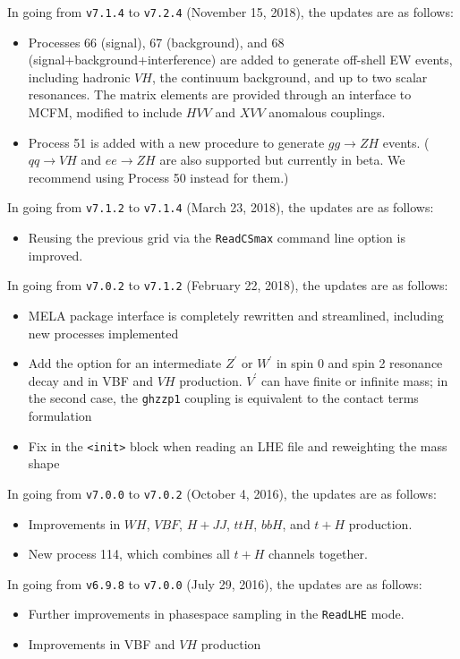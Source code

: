 \documentclass[aps,superscriptaddress,nofootinbib]{revtex4}
\begin{document}
In going from \verb|v7.1.4| to \verb|v7.2.4| (November 15, 2018), the updates are as follows:
\begin{itemize}
\item Processes 66 (signal), 67 (background), and 68 (signal+background+interference) are added to generate off-shell EW events, including hadronic $VH$, the continuum background, and up to two scalar resonances.  The matrix elements are provided through an interface to MCFM, modified to include $HVV$ and $XVV$ anomalous couplings.
\item Process 51 is added with a new procedure to generate $gg \to ZH$ events.  ($qq\to VH$ and $ee\to ZH$ are also supported but currently in beta.  We recommend using Process 50 instead for them.)
\end{itemize}
\noindent
In going from \verb|v7.1.2| to \verb|v7.1.4| (March 23, 2018), the updates are as follows:
\begin{itemize}
\item Reusing the previous grid via the \verb|ReadCSmax| command line option is improved.
\end{itemize}
\noindent
In going from \verb|v7.0.2| to \verb|v7.1.2| (February 22, 2018), the updates are as follows:
\begin{itemize}
\item MELA package interface is completely rewritten and streamlined, including new processes implemented
\item Add the option for an intermediate $Z^\prime$ or $W^\prime$ in spin 0 and spin 2 resonance decay and in VBF and $VH$ production.  $V^\prime$ can have finite or infinite mass; in the second case, the \verb|ghzzp1| coupling is equivalent to the contact terms formulation~\cite{Gonzalez-Alonso:2014eva}
\item Fix in the \verb|<init>| block when reading an LHE file and reweighting the mass shape
\end{itemize}
\noindent
In going from \verb|v7.0.0| to \verb|v7.0.2| (October 4, 2016), the updates are as follows:
\begin{itemize}
\item Improvements in $WH$, $VBF$, $H+JJ$, $ttH$, $bbH$, and $t+H$ production.
\item New process 114, which combines all $t+H$ channels together.
\end{itemize}
\noindent
In going from \verb|v6.9.8| to \verb|v7.0.0| (July 29, 2016), the updates are as follows:
\begin{itemize}
\item Further improvements in phasespace sampling in the \verb|ReadLHE| mode.
\item Improvements in VBF and $VH$ production
\end{itemize}
\end{document}
